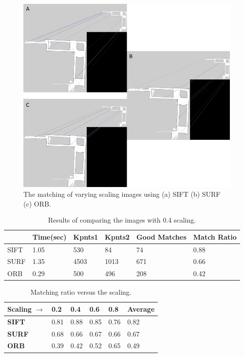 \begin{figure}[H]
    \centering
    \includegraphics[width=1\textwidth]{figs/The_matching_of_scale_0_4.png}
    \caption{ The matching of varying scaling images using (a) SIFT (b) SURF (c) ORB.}
    \label{fig:scaling}
\end{figure}

\begin{table}[H]
\centering
\caption{Results of comparing the images with 0.4 scaling.}
\begin{tabular}{ | m{3em} | m{2cm} | m{1.5cm} | m{1.5cm} | m{1.5cm} | m{3cm} | } 
\hline
& \textbf{Time(sec)} & \textbf{Kpnts1}  & \textbf{Kpnts2} & \textbf{Good Matches} & \textbf{Match Ratio}\\ 
\hline
SIFT  & 1.05 & 530 & 84 & 74 & 0.88\\ 
\hline
SURF  & 1.35 & 4503 & 1013 & 671 & 0.66\\ 
\hline
ORB  & 0.29 & 500 & 496 & 208 & 0.42\\ 
\hline
\end{tabular}
\label{table:scaling}
\end{table}


\begin{table}[H]
\centering
\caption{Matching ratio versus the scaling.}
\begin{tabular}{ | m{5em} | m{1cm} | m{1cm} | m{1cm} | m{1cm} | m{1.5cm} | } 
\hline
\textbf{Scaling $\rightarrow$} & \textbf{0.2} & \textbf{0.4} & \textbf{0.6} & \textbf{0.8} & \textbf{Average} \\ 
\hline
\textbf{SIFT}  & 0.81 & 0.88 & 0.85 & 0.76 & 0.82 \\ 
\hline
\textbf{SURF}  & 0.68 & 0.66 & 0.67 & 0.66 & 0.67 \\ 
\hline
\textbf{ORB}  & 0.39 & 0.42 & 0.52 & 0.65 & 0.49 \\ 
\hline
\hline
\end{tabular}
\label{table:scalingchange}
\end{table}

